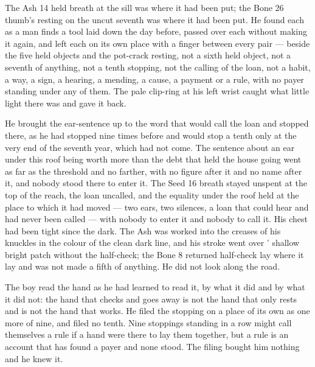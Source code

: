 The Ash 14 held breath at the sill was where it had been put; the Bone 26 thumb's resting on the uncut seventh was where it had been put. He found each as a man finds a tool laid down the day before, passed over each without making it again, and left each on its own place with a finger between every pair --- beside the five held objects and the pot-crack resting, not a sixth held object, not a seventh of anything, not a tenth stopping, not the calling of the loan, not a habit, a way, a sign, a hearing, a mending, a cause, a payment or a rule, with no payer standing under any of them. The pale clip-ring at his left wrist caught what little light there was and gave it back.

He brought the ear-sentence up to the word that would call the loan and stopped there, as he had stopped nine times before and would stop a tenth only at the very end of the seventh year, which had not come. The sentence about an ear under this roof being worth more than the debt that held the house going went as far as the threshold and no farther, with no figure after it and no name after it, and nobody stood there to enter it. The Seed 16 breath stayed unspent at the top of the reach, the loan uncalled, and the equality under the roof held at the place to which it had moved --- two ears, two silences, a loan that could hear and had never been called --- with nobody to enter it and nobody to call it. His chest had been tight since the dark. The Ash was worked into the creases of his knuckles in the colour of the clean dark line, and his stroke went over ' shallow bright patch without the half-check; the Bone 8 returned half-check lay where it lay and was not made a fifth of anything. He did not look along the road.

The boy read the hand as he had learned to read it, by what it did and by what it did not: the hand that checks and goes away is not the hand that only rests and is not the hand that works. He filed the stopping on a place of its own as one more of nine, and filed no tenth. Nine stoppings standing in a row might call themselves a rule if a hand were there to lay them together, but a rule is an account that has found a payer and none stood. The filing bought him nothing and he knew it.

\scenebreak

